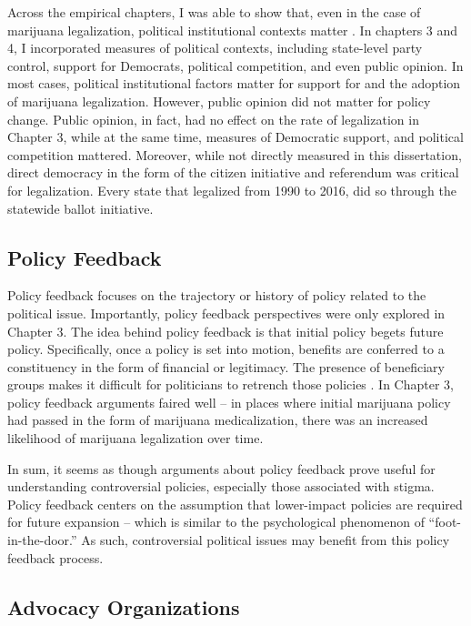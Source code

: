 Across the empirical chapters, I was able to show that, even in the case of marijuana legalization, political institutional contexts matter \citep{amenta_and_elliott_2019}. In chapters 3 and 4, I incorporated measures of political contexts, including state-level party control, support for Democrats, political competition, and even public opinion. In most cases, political institutional factors matter for support for and the adoption of marijuana legalization. However, public opinion did not matter for policy change. Public opinion, in fact, had no effect on the rate of legalization in Chapter 3, while at the same time, measures of Democratic support, and political competition mattered. Moreover, while not directly measured in this dissertation, direct democracy in the form of the citizen initiative and referendum was critical for legalization. Every state that legalized from 1990 to 2016,  did so through the statewide ballot initiative.

\subsection{Policy Feedback}

Policy feedback focuses on the trajectory or history of policy related to the political issue. Importantly, policy feedback perspectives were only explored in Chapter 3. The idea behind policy feedback is that initial policy begets future policy. Specifically, once a policy is set into motion, benefits are conferred to a constituency in the form of financial or legitimacy. The presence of beneficiary groups makes it difficult for politicians to retrench those policies \citep{pierson_2000}. In Chapter 3, policy feedback arguments faired well -- in places where initial marijuana policy had passed in the form of marijuana medicalization, there was an increased likelihood of marijuana legalization over time. 

In sum, it seems as though arguments about policy feedback prove useful for understanding controversial policies, especially those associated with stigma. Policy feedback centers on the assumption that lower-impact policies are required for future expansion -- which is similar to the psychological phenomenon of ``foot-in-the-door.'' As such, controversial political issues may benefit from this policy feedback process. 


\subsection{Advocacy Organizations}

